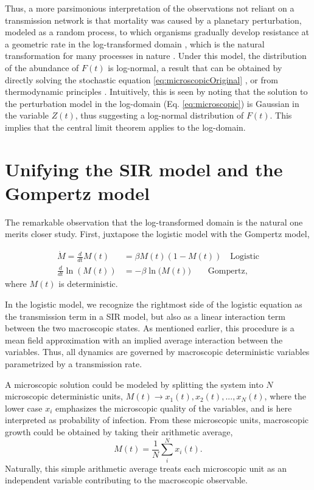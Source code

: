 \documentclass[review]{elsarticle}
\begin{document}
Thus, a more parsimonious interpretation of the observations not reliant on a transmission network is that mortality was caused by a planetary perturbation, modeled as a random process, to which organisms gradually develop resistance at a geometric rate in the log-transformed domain \citep{boxenbaum2017hypotheses,neafsey1988gompertz}, which is the natural transformation for many processes in nature \citep{zhang1994log}. 
Under this model, the distribution of the abundance of $F(t)$ is log-normal, a result that can be obtained by directly solving the stochastic equation \ref{eq:microscopicOriginal} \citep{skiadas2010exact,petroni2020gompertz}, or from thermodynamic principles \citep{sitaram1984statistical,gunasekaran1982lon,chakrabarti1996non}. 
Intuitively, this is seen by noting that the solution to the perturbation model in the log-domain (Eq. \ref{eq:microscopic}) is Gaussian in the variable $Z(t)$, thus suggesting a log-normal distribution of $F(t)$. This implies that the central limit theorem applies to the log-domain.

\section{Unifying the SIR model and the Gompertz model}
The remarkable observation that the log-transformed domain is the natural one merits closer study. First, juxtapose the logistic model with the Gompertz model,

\begin{subequations}
\begin{align}
\dot{M} = \frac{d}{dt}M(t) & = \beta M(t) (1-M(t)) \quad \text{Logistic}\label{eq:compareLog}\\ 
\frac{d}{dt}\ln{(M(t))} & = -\beta \ln{(M(t)}) \quad\quad\text{Gompertz}\label{eq:compareGom},
\end{align}
\end{subequations}
where $M(t)$ is deterministic. 

In the logistic model, we recognize the rightmost side of the logistic equation as the transmission term in a SIR model, but also as a linear interaction term between the two macroscopic states. 
As mentioned earlier, this procedure is a mean field approximation with an implied average interaction between the variables. 
Thus, all dynamics are governed by macroscopic deterministic variables parametrized by a transmission rate.

A microscopic solution could be modeled by splitting the system into $N$ microscopic deterministic units, $M(t) \rightarrow x_1(t), x_2(t), ..., x_N(t)$, where the lower case $x_i$ emphasizes the microscopic quality of the variables, and is here interpreted as probability of infection. From these microscopic units, macroscopic growth could be obtained by taking their arithmetic average,
\begin{equation}
M(t) = \frac{1}{N}\sum_i^N x_i(t).
\end{equation}
Naturally, this simple arithmetic average treats each microscopic unit as an independent variable contributing to the macroscopic observable.
\end{document}
